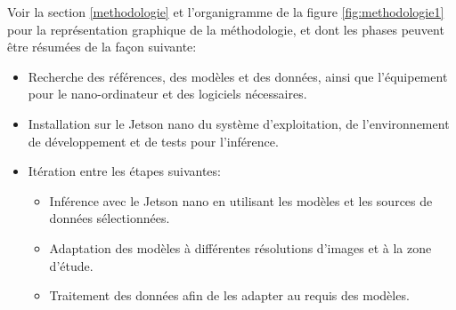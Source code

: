\par Voir la section \ref{methodologie} et l'organigramme de la figure \ref{fig:methodologie1} pour la représentation graphique de la méthodologie, et dont les phases peuvent être résumées de la façon suivante:  
\begin{itemize}
   \item Recherche des références, des modèles et des données, ainsi que l'équipement pour le nano-ordinateur et des logiciels nécessaires.
   \item Installation sur le Jetson nano du système d'exploitation, de l'environnement de développement et de tests pour l'inférence.
   \item Itération entre les étapes suivantes:
   \begin{itemize}
      \item Inférence avec le Jetson nano en utilisant les modèles et les sources de données sélectionnées.
      \item Adaptation des modèles à différentes résolutions d'images et à la zone d'étude.
      \item Traitement des données afin de les adapter au requis des modèles.
   \end{itemize}
\end{itemize}

